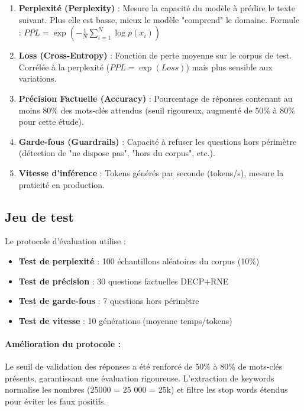 \begin{enumerate}
    \item \textbf{Perplexité (Perplexity)} : Mesure la capacité du modèle à prédire le texte suivant. Plus elle est basse, mieux le modèle "comprend" le domaine. Formule : $PPL = \exp\left(-\frac{1}{N}\sum_{i=1}^{N} \log p(x_i)\right)$
    
    \item \textbf{Loss (Cross-Entropy)} : Fonction de perte moyenne sur le corpus de test. Corrélée à la perplexité ($PPL = \exp(Loss)$) mais plus sensible aux variations.
    
    \item \textbf{Précision Factuelle (Accuracy)} : Pourcentage de réponses contenant au moins 80\% des mots-clés attendus (seuil rigoureux, augmenté de 50\% à 80\% pour cette étude).
    
    \item \textbf{Garde-fous (Guardrails)} : Capacité à refuser les questions hors périmètre (détection de "ne dispose pas", "hors du corpus", etc.).
    
    \item \textbf{Vitesse d'inférence} : Tokens générés par seconde (tokens/s), mesure la praticité en production.
\end{enumerate}

\subsection{Jeu de test}

Le protocole d'évaluation utilise :
\begin{itemize}
    \item \textbf{Test de perplexité} : 100 échantillons aléatoires du corpus (10\%)
    \item \textbf{Test de précision} : 30 questions factuelles DECP+RNE
    \item \textbf{Test de garde-fous} : 7 questions hors périmètre
    \item \textbf{Test de vitesse} : 10 générations (moyenne temps/tokens)
\end{itemize}

\paragraph{Amélioration du protocole :} Le seuil de validation des réponses a été renforcé de 50\% à 80\% de mots-clés présents, garantissant une évaluation rigoureuse. L'extraction de keywords normalise les nombres (25000 = 25 000 = 25k) et filtre les stop words étendus pour éviter les faux positifs.

